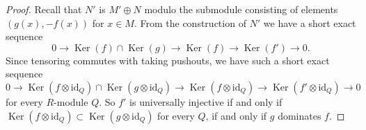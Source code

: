 \documentclass[10pt,a4paper]{amsart}
\theoremstyle{plain}
\theoremstyle{definition}
\theoremstyle{remark}
\numberwithin{equation}{subsection}
\def\Ker{\mathop{\mathrm{Ker}}}
\begin{document}
\begin{proof}
Recall that $N'$ is $M' \oplus N$ modulo the submodule consisting of elements
$(g(x), -f(x))$ for $x \in M$.
From the construction of $N'$ we have a short exact sequence
$$
0 \to \Ker(f) \cap \Ker(g) \to \Ker(f) \to \Ker(f')
\to 0.
$$
Since tensoring commutes with taking pushouts, we have such a short exact
sequence
$$
0 \to \Ker(f \otimes \text{id}_Q ) \cap \Ker(g \otimes
\text{id}_Q) \to \Ker(f \otimes \text{id}_Q)
\to \Ker(f' \otimes \text{id}_Q) \to 0
$$
for every $R$-module $Q$.  So $f'$ is universally injective if and only if
$\Ker(f \otimes \text{id}_Q ) \subset \Ker(g \otimes
\text{id}_Q)$ for every $Q$, if and only if $g$ dominates $f$.
\end{proof}
\end{document}
